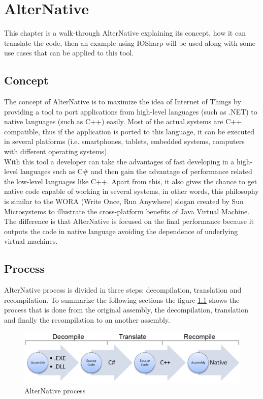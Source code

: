\chapter{AlterNative}\label{C:AlterNative}
This chapter is a walk-through AlterNative explaining its concept, how it can translate the code, then an example using IOSharp will be used along with some use cases that can be applied to this tool.
\section{Concept}\label{S:AN-Concept}
The concept of AlterNative is to maximize the idea of Internet of Things by providing a tool to port applications from high-level languages (such as .NET) to native languages (such as C++) easily. Most of the actual systems are C++ compatible, thus if the application is ported to this language, it can be executed in several platforms (i.e. smartphones, tablets, embedded systems, computers with different operating systems).
\\
With this tool a developer can take the advantages of fast developing in a high-level languages such as C\# and then gain the advantage of performance related the low-level languages like C++. Apart from this, it also gives the chance to get native code capable of working in several systems, in other words, this philosophy is similar to the WORA (Write Once, Run Anywhere) slogan created by Sun Microsystems to illustrate the cross-platform benefits of Java Virtual Machine. The difference is that AlterNative is focused on the final performance because it outputs the code in native language avoiding the dependence of underlying virtual machines.
\section{Process}\label{S:AN-Process}
AlterNative process is divided in three steps: decompilation, translation and recompilation.
To summarize the following sections the figure \ref{fig:AN-Process} shows the process that is done from the original assembly, the decompilation, translation and finally the recompilation to an another assembly.
\begin{figure}[H]\begin{center}
 \centering
  \captionsetup{justification=centering}
  \includegraphics[width=1\textwidth]{pictures/alternative/process}
  \caption{AlterNative process\label{fig:AN-Process}}
\end{center}\end{figure}

